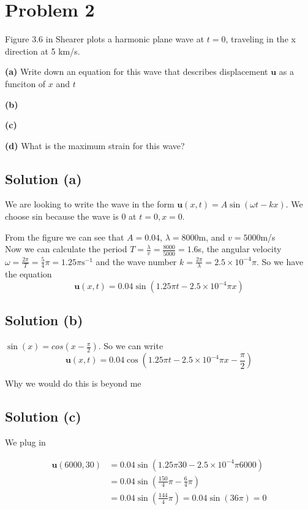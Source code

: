 \section*{Problem 2}

Figure 3.6 in Shearer plots a harmonic plane wave at $t=0$, traveling in the x direction at 5 km/s.

\textbf{(a)} Write down an equation for this wave that describes displacement $\mathbf{u}$ as a funciton of $x$ and $t$

\textbf{(b)}

\textbf{(c)}

\textbf{(d)} What is the maximum strain for this wave?

\subsection*{Solution (a)}

We are looking to write the wave in the form $\mathbf{u}(x,t) = A\sin(\omega t - kx)$. We choose sin because the wave is 0 at $t = 0, x = 0$.

From the figure we can see that $A = 0.04$, $\lambda = 8000$m, and $v = 5000$m/s\\
Now we can calculate the period $T = \frac{\lambda}{v} = \frac{8000}{5000} = 1.6$s, the angular velocity $\omega = \frac{2\pi}{T} = \frac{5}{4}\pi = 1.25\pi \text{s}^{-1}$ and the wave number $k = \frac{2\pi}{\lambda} = 2.5\times 10^{-4}\pi$. So we have the equation
\begin{equation*}
    \mathbf{u}(x,t) = 0.04\sin(1.25\pi t - 2.5\times 10^{-4}\pi x)
\end{equation*}

\subsection*{Solution (b)}
$\sin(x) = cos(x - \frac{\pi}{2})$. So we can write 
\begin{equation*}
    \mathbf{u}(x,t) = 0.04\cos(1.25\pi t - 2.5\times 10^{-4}\pi x - \frac{\pi}{2})
\end{equation*}

Why we would do this is beyond me

\subsection*{Solution (c)}

We plug in

\begin{align*}
    \mathbf{u}(6000,30) &= 0.04\sin(1.25\pi 30 - 2.5\times 10^{-4}\pi 6000)\\
    &= 0.04\sin(\frac{150}{4} \pi - \frac{6}{4}\pi) \\
    &= 0.04\sin(\frac{144}{4}\pi) = 0.04\sin(36\pi) = 0
\end{align*}

